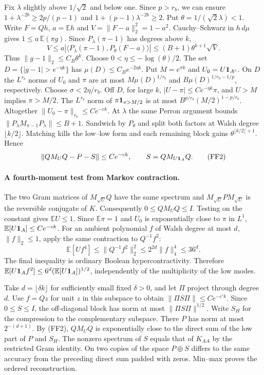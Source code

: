 Fix $\lambda$ slightly above $1/\sqrt2$ and below one. Since $p>r_b$,
we can ensure $1+\lambda^{-2b}\ge2p/(p-1)$ and
$1+(p-1)\lambda^{-2b}\ge2$. Put $\theta=1/(\sqrt2\lambda)<1$.
Write $F=Qh$, $a=\mathbb E h$ and $V=\|F-a\|_2^2=1-a^2$.
Cauchy--Schwarz in $h\,d\mu$ gives $1\le a\,\mathbb E(\pi g)$.
Since $P_\lambda(\pi-1)$ has degrees above $k$,
\[
 V\le a|\langle P_\lambda(\pi-1),P_\theta(F-a)\rangle|
       \le (B+1)\theta^{k+1}\sqrt V .
\]
Thus $\|g-1\|_2\le C_B\theta^k$. Choose $0<\eta\le-\log(\theta)/2$.
The set $D=\{|g-1|>e^{-\eta k}\}$ has $\mu(D)\le C_B e^{-2\eta k}$.
Put $M=e^{\sigma k}$ and $U_0=U{\bf1}_{A^c}$. On $D$ the $L^{r_b}$
norms of $U_0$ and $\pi$ are at most $M\mu(D)^{1/r_b}$ and
$B\mu(D)^{1/r_b-1/p}$, respectively. Choose $\sigma<2\eta/r_b$.
Off $D$, for large $k$, $|U-\pi|\le Ce^{-\eta k}\pi$, and $U>M$
implies $\pi>M/2$. The $L^{r_b}$ norm of $\pi{\bf1}_{\pi>M/2}$
is at most $B^{p/r_b}(M/2)^{1-p/r_b}$. Altogether
$\|U_0-\pi\|_{r_b}\le Ce^{-ck}$.
At $\lambda$ the same Perron argument bounds
$\|P_\lambda M_{\pi-1}P_\lambda\|\le B+1$.
Sandwich by $P_\theta$ and split both factors at Walsh degree
$\lfloor k/2\rfloor$. Matching kills the low--low form and each remaining
block gains $\theta^{\lfloor k/2\rfloor+1}$. Hence
\[
 \|QM_UQ-P-S\|\le Ce^{-ck},\qquad S=QM_{U{\bf1}_A}Q .                \tag{FF2}
\]

\paragraph{A fourth-moment test from Markov contraction.}
The two Gram matrices of $M_{\sqrt U}Q$ have the same spectrum and
$M_{\sqrt U}PM_{\sqrt U}$ is the reversible conjugate of $K$.
Consequently $0\le QM_UQ\le I$. Testing on the constant gives
$\mathbb E U\le1$. Since $\mathbb E\pi=1$ and $U_0$ is exponentially
close to $\pi$ in $L^1$, $\mathbb E[U{\bf1}_A]\le Ce^{-ck}$.
For an ambient polynomial $f$ of Walsh degree at most $d$, $\|f\|_2\le1$,
apply the same contraction to $Q^{-1}f^2$:
\[
 \mathbb E[U f^4]\le\|Q^{-1}f^2\|_2^2\le2^{2d}\|f\|_4^4\le36^d .
\]
The final inequality is ordinary Boolean hypercontractivity. Therefore
$\mathbb E[U{\bf1}_A f^2]\le6^d(\mathbb E[U{\bf1}_A])^{1/2}$,
independently of the multiplicity of the low modes.

Take $d=\lfloor\delta k\rfloor$ for sufficiently small fixed $\delta>0$,
and let $\Pi$ project through degree $d$. Use $f=Qz$ for unit $z$ in
this subspace to obtain $\|\Pi S\Pi\|\le Ce^{-c'k}$. Since $0\le S\le I$,
the off-diagonal block has norm at most $\|\Pi S\Pi\|^{1/2}$.
Write $S_H$ for the compression to the complementary subspace. There
$P$ has norm at most $2^{-(d+1)}$. By (FF2), $QM_UQ$ is exponentially
close to the direct sum of the low part of $P$ and $S_H$.
The nonzero spectrum of $S$ equals that of $K_{AA}$ by the restricted
Gram identity. On two copies of the space $P\oplus S$ differs to the
same accuracy from the preceding direct sum padded with zeros.
Min--max proves the ordered reconstruction.

